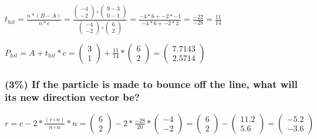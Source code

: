 $
    t_{hit}
=
    \frac{n * (B - A)}{n * c}
=
    \frac{
        \left(\begin{array}{c}
            -4\\
            -2
        \end{array}\right)
        \circ
        \left(\begin{array}{c}
            9 - 3\\
            0 - 1
        \end{array}\right)
    }{
        \left(\begin{array}{c}
            -4\\
            -2
        \end{array}\right)
        \circ
        \left(\begin{array}{c}
            6\\
            2
        \end{array}\right)
    }
=
    \frac{
        -4 * 6 + -2 * -1
    }{
        -4 * 6 + -2 * 2
    }
=
    \frac{-22}{-28}
=
    \frac{11}{14}
$

$
    P_{hit}
=
    A + t_{hit} * c
=
    \left(\begin{array}{c}
        3\\
        1
    \end{array}\right)
    +
    \frac{11}{14}
    *
    \left(\begin{array}{c}
        6\\
        2
    \end{array}\right)
=
    \left(\begin{array}{c}
        7.7143\\
        2.5714
    \end{array}\right)
$

\subsubsection{(3\%) If the particle is made to bounce off the line, what will its new direction vector be?}

$
    r
=
    c - 2 * \frac{(c \circ n)}{n \circ n} * n
=
    \left(\begin{array}{c}
        6\\
        2
    \end{array}\right)
    -
    2
    *
    \frac{-28}{20}
    *
    \left(\begin{array}{c}
        -4\\
        -2
    \end{array}\right)
=
    \left(\begin{array}{c}
        6\\
        2
    \end{array}\right)
    -
    \left(\begin{array}{c}
        11.2\\
        5.6
    \end{array}\right)
=
    \left(\begin{array}{c}
        -5.2\\
        -3.6
    \end{array}\right)
$